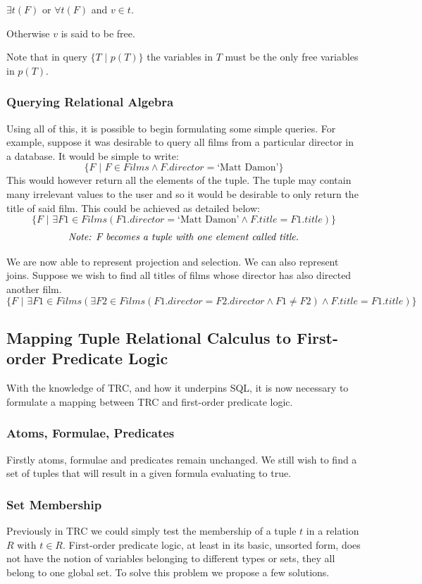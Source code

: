 \documentclass[a4paper, 11pt]{article}
\begin{document}
      $\exists t(F)$ or $\forall t(F)$ and $v \in t$.

      Otherwise $v$ is said to be free.

      Note that in query $\{T\text{ | }p(T)\}$ the variables in $T$ must be the only
      free variables in $p(T)$.

    \subsubsection{Querying Relational Algebra}
      Using all of this, it is possible to begin formulating some simple
      queries. For example, suppose it was desirable to query all films from a
      particular director in a database. It would be simple to write:
      $$ \{F\text{ | }F \in Films \land F.director = \text{`Matt Damon'}\} $$
      This would however return all the elements of the tuple. The tuple may
      contain many irrelevant values to the user and so it would be desirable
      to only return the title of said film. This could be achieved as detailed
      below:
      $$ \{F\text{ | } \exists F1 \in Films(F1.director = \text{`Matt Damon'}
           \land F.title = F1.title)\} $$
      $$ \emph{Note: F becomes a tuple with one element called title.} $$

      We are now able to represent projection and selection. We can also
      represent joins. Suppose we wish to find all titles of films
      whose director has also directed another film.
      $$ \{F\text{ | }\exists F1 \in Films(\exists F2 \in Films(F1.director =
           F2.director \land F1 \neq F2) \land F.title = F1.title)\} $$

  \subsection{Mapping Tuple Relational Calculus to First-order Predicate Logic}
    \label{sec:tuplefo}
    With the knowledge of TRC, and how it underpins SQL, it is now necessary to
    formulate a mapping between TRC and first-order predicate logic.

    \subsubsection{Atoms, Formulae, Predicates}
      Firstly atoms, formulae and predicates remain unchanged. We still wish to
      find a set of tuples that will result in a given formula evaluating to
      true.

    \subsubsection{Set Membership}
      Previously in TRC we could simply test the membership of a tuple $t$ in a
      relation $R$ with $t \in R$. First-order predicate logic, at least in its
      basic, unsorted form, does not have the notion of variables belonging to
      different types or sets, they all belong to one global set. To solve this
      problem we propose a few solutions.
\end{document}
